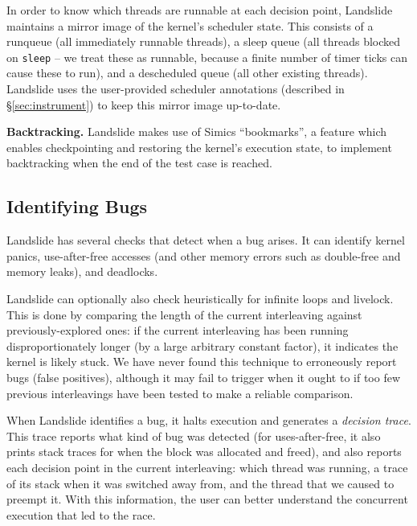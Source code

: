 \documentclass{llncs}
\begin{document}
In order to know which threads are runnable at each decision point, Landslide maintains a mirror image of the kernel's scheduler state. This consists of a runqueue (all immediately runnable threads), a sleep queue (all threads blocked on \texttt{sleep} -- we treat these as runnable, because a finite number of timer ticks can cause these to run), and a descheduled queue (all other existing threads).
Landslide uses the user-provided scheduler annotations (described in \S\ref{sec:instrument}) to keep this mirror image up-to-date.

{\bf Backtracking.} Landslide makes use of Simics ``bookmarks'', a feature
which enables checkpointing and restoring the kernel's execution state, to implement
backtracking when the end of the test case is reached.

\squish
\subsection{Identifying Bugs}
\squish


Landslide has several checks that detect when a bug arises. It can identify kernel panics, use-after-free accesses (and other memory errors such as double-free and memory leaks), and deadlocks.

Landslide can optionally also check heuristically for infinite loops and livelock. This is done by comparing the length of the current interleaving against previously-explored ones: if the current interleaving has been running disproportionately longer (by a large arbitrary constant factor), it indicates the kernel is likely stuck.
We have never found this technique to erroneously report bugs (false positives), although it may fail to trigger when it ought to if too few previous interleavings have been tested to make a reliable comparison.

When Landslide identifies a bug, it halts execution and generates a {\em decision trace}. This trace reports what kind of bug was detected (for uses-after-free, it also prints stack traces for when the block was allocated and freed), and also reports each decision point in the current interleaving: which thread was running, a trace of its stack when it was switched away from, and the thread that we caused to preempt it. With this information, the user can better understand the concurrent execution that led to the race.
\end{document}
